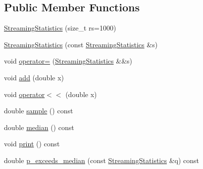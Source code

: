 \subsection*{Public Member Functions}
\begin{DoxyCompactItemize}
\item 
\hyperlink{class_fleet_1_1_statistics_1_1_streaming_statistics_a7b22725325625cc7f8c89cce4a19c719}{Streaming\+Statistics} (size\+\_\+t rs=1000)
\item 
\hyperlink{class_fleet_1_1_statistics_1_1_streaming_statistics_ad49b1027b011502f29c9df1d211cf40d}{Streaming\+Statistics} (const \hyperlink{class_fleet_1_1_statistics_1_1_streaming_statistics}{Streaming\+Statistics} \&s)
\item 
void \hyperlink{class_fleet_1_1_statistics_1_1_streaming_statistics_a78daaf22f5e2abd44f82b2e8d2f2cb55}{operator=} (\hyperlink{class_fleet_1_1_statistics_1_1_streaming_statistics}{Streaming\+Statistics} \&\&s)
\item 
void \hyperlink{class_fleet_1_1_statistics_1_1_streaming_statistics_ad7e44e59ea2472186926250f0de54831}{add} (double x)
\item 
void \hyperlink{class_fleet_1_1_statistics_1_1_streaming_statistics_af5bcdaff2f20a0048a5b28af8582adf3}{operator$<$$<$} (double x)
\item 
double \hyperlink{class_fleet_1_1_statistics_1_1_streaming_statistics_a65b06c5de083ac12d5b74facd5444973}{sample} () const
\item 
double \hyperlink{class_fleet_1_1_statistics_1_1_streaming_statistics_a70d2554ea987b7e3278b018fdc5ca95a}{median} () const
\item 
void \hyperlink{class_fleet_1_1_statistics_1_1_streaming_statistics_acae72aac2b6ad1ce89e725c001e4e833}{print} () const
\item 
double \hyperlink{class_fleet_1_1_statistics_1_1_streaming_statistics_a0b7d6df2facb2257ec8ef7d4de68fd52}{p\+\_\+exceeds\+\_\+median} (const \hyperlink{class_fleet_1_1_statistics_1_1_streaming_statistics}{Streaming\+Statistics} \&q) const
\end{DoxyCompactItemize}
